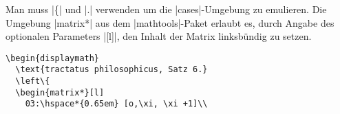 % 

Man muss |\left\{| und |\right.| verwenden um die |cases|-Umgebung zu emulieren. Die Umgebung |matrix*| aus dem |mathtools|-Paket erlaubt es, durch Angabe des optionalen Parameters |[l]|, den Inhalt der Matrix linksbündig zu setzen.                                                                                       
\begin{lstlisting}                                                                                                                                                                                                                                                                                                             
\begin{displaymath}                                                                                                                                                                                                                                                                                                            
  \text{tractatus philosophicus, Satz 6.}                                                                                                                                                                                                                                                                                      
  \left\{                                                                                                                                                                                                                                                                                                                      
  \begin{matrix*}[l]                                                                                                                                                                                                                                                                                                           
    03:\hspace*{0.65em} [o,\xi, \xi +1]\\                                                                                                                                                                                                                                                                                      

\end{lstlisting}
